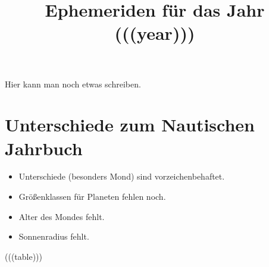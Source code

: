 \documentclass[a4paper, twoside]{book}
\title{Ephemeriden für das Jahr (((year)))}
\begin{document}
\sffamily
\maketitle
Hier kann man noch etwas schreiben.


\newpage

\section{Unterschiede zum Nautischen Jahrbuch}
\begin{itemize}
\item Unterschiede (besonders Mond) sind vorzeichenbehaftet.
\item Größenklassen für Planeten fehlen noch.
\item Alter des Mondes fehlt.
\item Sonnenradius fehlt.
\end{itemize}

\newpage

(((table)))
\end{document}
